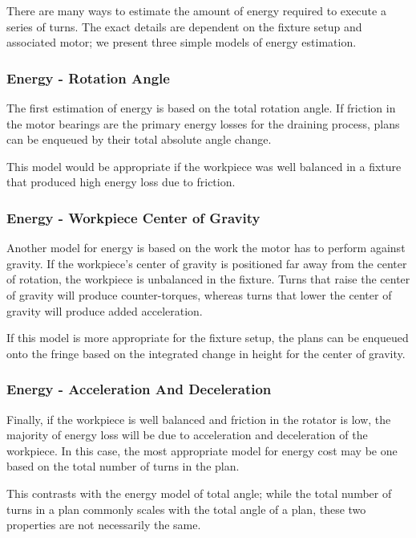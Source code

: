 There are many ways to estimate the amount of energy required to execute a series of turns. The exact details are dependent on the fixture setup and associated motor; we present three simple models of energy estimation.

		\subsubsection{Energy - Rotation Angle}

The first estimation of energy is based on the total rotation angle. If friction in the motor bearings are the primary energy losses for the draining process, plans can be enqueued by their total absolute angle change.

This model would be appropriate if the workpiece was well balanced in a fixture that produced high energy loss due to friction.

		\subsubsection{Energy - Workpiece Center of Gravity}

Another model for energy is based on the work the motor has to perform against gravity. If the workpiece's center of gravity is positioned far away from the center of rotation, the workpiece is unbalanced in the fixture. Turns that raise the center of gravity will produce counter-torques, whereas turns that lower the center of gravity will produce added acceleration.

If this model is more appropriate for the fixture setup, the plans can be enqueued onto the fringe based on the integrated change in height for the center of gravity.

		\subsubsection{Energy - Acceleration And Deceleration}

Finally, if the workpiece is well balanced and friction in the rotator is low, the majority of energy loss will be due to acceleration and deceleration of the workpiece. In this case, the most appropriate model for energy cost may be one based on the total number of turns in the plan.

This contrasts with the energy model of total angle; while the total number of turns in a plan commonly scales with the total angle of a plan, these two properties are not necessarily the same.

